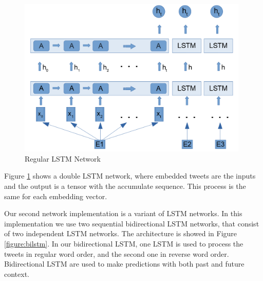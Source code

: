 \documentclass[12pt]{report}
\begin{document}
\begin{figure}[H]	
	\centering
	\includegraphics[width=110mm, scale = 1]{images/12_lstm_only.png}	
	\caption{Regular LSTM Network}	
	\label{figure:lstm_only}
\end{figure}

Figure \ref{figure:lstm_only} shows a double \ac{LSTM} network, where embedded tweets are the inputs and the output is a tensor with the accumulate sequence. This process is the same for each embedding vector.

Our second network implementation is a variant of \ac{LSTM} networks. In this implementation we use two sequential bidirectional LSTM networks, that consist of
 two independent \ac{LSTM} networks. The architecture is showed in Figure \ref{figure:bilstm}. In our bidirectional LSTM,  one LSTM is used to process the tweets in regular word order,  and the second one in reverse word order. Bidirectional LSTM are used to make predictions with both past and future context. 
 

\end{document}
